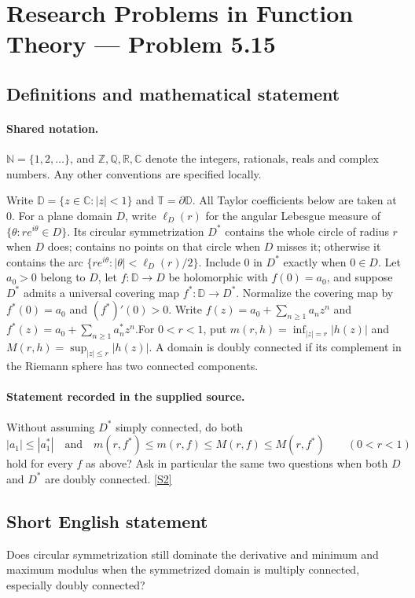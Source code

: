 \documentclass[11pt]{article}
\newcommand{\sref}[2]{\hyperlink{source:#1:#2}{[S#2]}}
\begin{document}
\section{Research Problems in Function Theory — Problem 5.15}\label{statement}

\subsection{Definitions and mathematical statement}

\paragraph{Shared notation.}$\mathbb N=\{1,2,\ldots\}$, and $\mathbb Z,\mathbb Q,\mathbb R,\mathbb C$ denote the integers, rationals, reals and complex numbers. Any other conventions are specified locally.


Write $\mathbb D=\{z\in\mathbb C:|z|<1\}$ and $\mathbb T=\partial\mathbb D$. All Taylor coefficients below are taken at $0$. For a plane domain $D$, write $\ell_D(r)$ for the angular Lebesgue measure of $\{\theta:re^{i\theta}\in D\}$. Its circular symmetrization $D^*$ contains the whole circle of radius $r$ when $D$ does; contains no points on that circle when $D$ misses it; otherwise it contains the arc $\{re^{i\theta}:|\theta|<\ell_D(r)/2\}$. Include $0$ in $D^*$ exactly when $0\in D$. Let $a_0>0$ belong to $D$, let $f:\mathbb D\to D$ be holomorphic with $f(0)=a_0$, and suppose $D^*$ admits a universal covering map $f^*:\mathbb D\to D^*$. Normalize the covering map by $f^*(0)=a_0$ and $(f^*)'(0)>0$. Write $f(z)=a_0+\sum_{n\ge1}a_nz^n$ and $f^*(z)=a_0+\sum_{n\ge1}a_n^*z^n$.For $0<r<1$, put $m(r,h)=\inf_{|z|=r}|h(z)|$ and $M(r,h)=\sup_{|z|\le r}|h(z)|$. A domain is doubly connected if its complement in the Riemann sphere has two connected components.
\paragraph{Statement recorded in the supplied source.}
Without assuming $D^*$ simply connected, do both
\[|a_1|\le |a_1^*|\quad\text{and}\quad m(r,f^*)\le m(r,f)\le M(r,f)\le M(r,f^*)\qquad(0<r<1)\]
hold for every $f$ as above? Ask in particular the same two questions when both $D$ and $D^*$ are doubly connected. \sref{statement}{2}
\subsection{Short English statement}
Does circular symmetrization still dominate the derivative and minimum and maximum modulus when the symmetrized domain is multiply connected, especially doubly connected?
\end{document}
